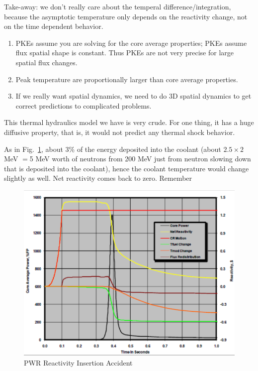 \documentclass{school-22.211-notes}
\begin{document}
Take-away: we don't really care about the temperal difference/integration, because the asymptotic temperature only depends on the reactivity change, not on the time dependent behavior. 



\clearpage
{}
\begin{enumerate}
\item PKEs assume you are solving for the core average properties; PKEs assume flux spatial shape is constant. Thus PKEs are not very precise for large spatial flux changes. 
\item Peak temperature are proportionally larger than core average properties.
\item If we really want spatial dynamics, we need to do 3D spatial dynamics to get correct predictions to complicated problems. 
\end{enumerate}
This thermal hydraulics model we have is very crude. For one thing, it has a huge diffusive property, that is, it would not predict any thermal shock behavior. 


As in Fig.~\ref{fn4}, about 3\% of the energy deposited into the coolant (about $2.5 \times 2$ MeV $=$5 MeV worth of neutrons from 200 MeV just from neutron slowing down that is deposited into the coolant), hence the coolant temperature would change slightly as well. Net reactivity comes back to zero. Remember 
  \begin{figure}[ht] 
    \centering
    \includegraphics[width=6in]{images/pke/fn4.png}
    \caption{PWR Reactivity Insertion Accident} \label{fn4}
  \end{figure}
\end{document}
